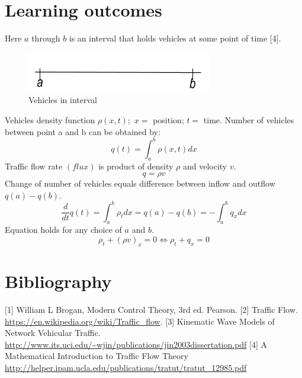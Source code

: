 \documentclass[12pt,a4paper]{report}
\begin{document}
	\section*{Learning outcomes}
	Here $a$ through $b$ is an interval that holds vehicles at some point of time [4].
	\begin{figure}[hbtp]
		\centering
		\includegraphics[scale=1]{interval.png}
		\caption{Vehicles in interval}
	\end{figure}
	Vehicles density function $\rho (x, t);$ $ x = $ position; $t = $ time.
	Number of vehicles between point a and b can be obtained by:
	$$q(t) = \int_a^b \rho (x, t)dx$$
	Traffic flow rate $(flux)$ is product of density $\rho$ and velocity $v.$
	$$q = \rho v$$
	Change of number of vehicles equals difference between inflow and outflow $q(a) - q(b).$
	$$\frac{d}{dt}q(t) = \int_a^b \rho_tdx = q(a) - q(b) = -\int_a^b q_xdx$$
	Equation holds for any choice of $a$ and $b.$
	$$\rho_t + (\rho v)_x = 0 \iff \rho_t + q_x = 0$$
	
	
	\section*{Bibliography}
	[1] William L Brogan, Modern Control Theory, 3rd ed. Pearson. 
	[2] Traffic Flow. \url{https://en.wikipedia.org/wiki/Traffic_flow}. 
	[3] Kinematic Wave Models of Network Vehicular Traffic. \url{http://www.its.uci.edu/~wjin/publications/jin2003dissertation.pdf} 
	[4] A Mathematical Introduction to Traffic Flow Theory \url{http://helper.ipam.ucla.edu/publications/tratut/tratut_12985.pdf}
\end{document}
